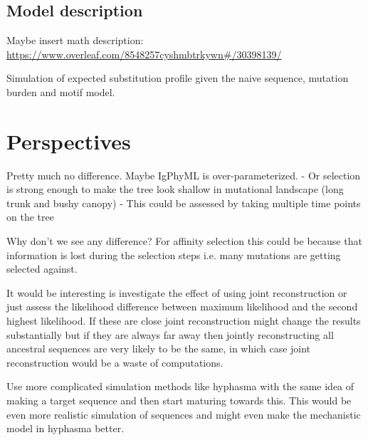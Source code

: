 \section{Model description}
Maybe insert math description:
\url{https://www.overleaf.com/8548257cyshmbtrkywn#/30398139/}




Simulation of expected substitution profile given the naive sequence, mutation burden and motif model.








\fi

\chapter{Perspectives}

Pretty much no difference.
Maybe IgPhyML is over-parameterized.
    - Or selection is strong enough to make the tree look shallow in mutational landscape (long trunk and bushy canopy)
    - This could be assessed by taking multiple time points on the tree

Why don't we see any difference? For affinity selection this could be because that information is lost during the selection steps i.e. many mutations are getting selected against.


It would be interesting is investigate the effect of using joint reconstruction or just assess the likelihood difference between maximum likelihood and the second highest likelihood. If these are close joint reconstruction might change the results substantially but if they are always far away then jointly reconstructing all ancestral sequences are very likely to be the same, in which case joint reconstruction would be a waste of computations.






Use more complicated simulation methods like hyphasma with the same idea of making a target sequence and then start maturing towards this.
This would be even more realistic simulation of sequences and might even make the mechanistic model in hyphasma better.





